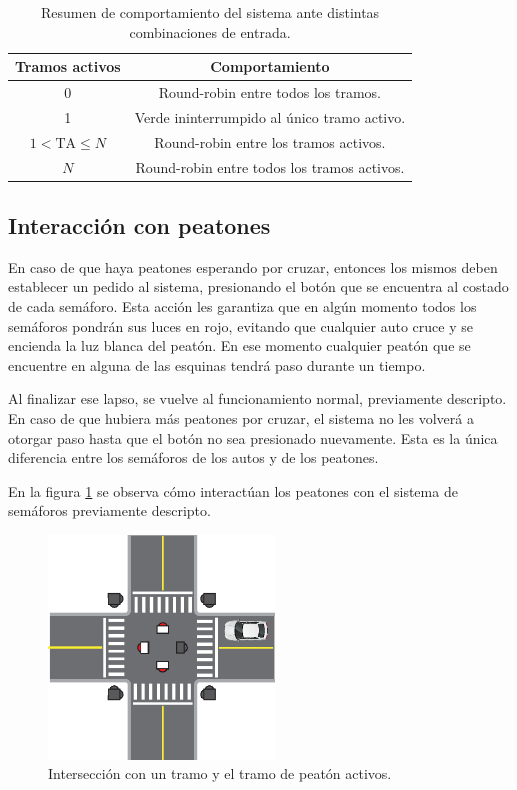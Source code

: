 	\begin{table}[htbp]
		\centering
		\caption{Resumen de comportamiento del sistema ante distintas combinaciones de entrada.}
		\vspace{0.25cm}
		\label{tab:comportamiento}
		\begin{tabular}{cc}
			\toprule
			\bf{Tramos activos} & \bf{Comportamiento} \\
			\midrule
			0 & Round-robin entre todos los tramos. \\
			1 & Verde ininterrumpido al único tramo activo. \\
			$1 < \mbox{TA} \le N$ & Round-robin entre los tramos activos. \\
			$N$ & Round-robin entre todos los tramos activos. \\
			\bottomrule
		\end{tabular}
	\end{table}



\subsection{Interacción con peatones}

	En caso de que haya peatones esperando por cruzar, entonces los mismos deben establecer un pedido al sistema, presionando el botón que se encuentra al costado de cada semáforo.
	Esta acción les garantiza que en algún momento todos los semáforos pondrán sus luces en rojo, evitando que cualquier auto cruce y se encienda la luz blanca del peatón.
	En ese momento cualquier peatón que se encuentre en alguna de las esquinas tendrá paso durante un tiempo.

	Al finalizar ese lapso, se vuelve al funcionamiento normal, previamente descripto.
	En caso de que hubiera más peatones por cruzar, el sistema no les volverá a otorgar paso hasta que el botón no sea presionado nuevamente.
	Esta es la única diferencia entre los semáforos de los autos y de los peatones.

	En la figura \ref{fig:peaton-activo} se observa cómo interactúan los peatones con el sistema de semáforos previamente descripto.

	\begin{figure}[htbp]
		\centering
		\includegraphics[width=6cm]{imagenes/peaton-auto.eps}
		\caption{Intersección con un tramo y el tramo de peatón activos.}
		\label{fig:peaton-activo}
	\end{figure}




